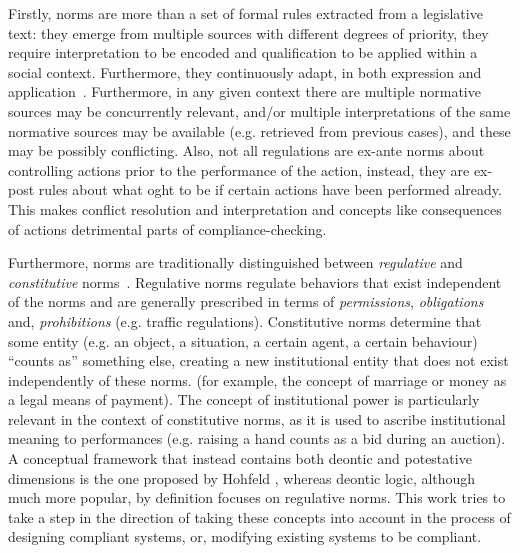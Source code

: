 Firstly, norms are more than a set of formal rules extracted from a legislative text: they emerge from multiple sources with different degrees of priority, they require interpretation to be encoded and qualification to be applied within a social context. Furthermore, they continuously adapt, in both expression and application~\cite{Boella2014APractice}. Furthermore, in any given context there are multiple normative sources may be concurrently relevant, and/or multiple interpretations of the same normative sources may be available (e.g. retrieved from previous cases), and these may be possibly conflicting. Also, not all regulations are ex-ante norms about controlling actions prior to the performance of the action, instead, they are ex-post rules about what oght to be if certain actions have been performed already. This makes conflict resolution and interpretation and concepts like consequences of actions detrimental parts of compliance-checking.


Furthermore, norms are traditionally distinguished between \textit{regulative} and \textit{constitutive} norms~\cite{Searle1969,Boella2004RegulativeSystems,Sileno2015}. Regulative norms regulate behaviors that exist independent of the norms and are generally prescribed in terms of \textit{permissions}, \textit{obligations} and, \textit{prohibitions} (e.g. traffic regulations). Constitutive norms determine that some entity (e.g. an object, a situation, a certain agent, a certain behaviour) ``counts as'' something else, creating a new institutional entity that does not exist independently of these norms. (for example, the concept of marriage or money as a legal means of payment). The concept of institutional power is particularly relevant in the context of constitutive norms, as it is used to ascribe institutional meaning to  performances (e.g. raising a hand counts as a bid during an auction). A conceptual framework that instead contains both deontic and potestative dimensions is the one proposed by Hohfeld \cite{hohfeld1917fundamental}, whereas deontic logic, although much more popular, by definition focuses on regulative norms. This work tries to take a step in the direction of taking these concepts into account in the process of designing compliant systems, or, modifying existing systems to be compliant.


